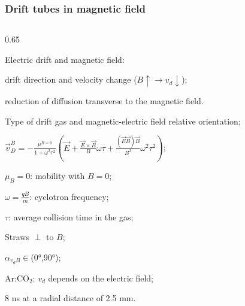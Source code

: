 \documentclass{beamer}
\begin{document}
\begin{frame}
    \frametitle{Drift tubes in magnetic field}

    \vspace{-3mm}
    \begin{columns}
        \begin{column}{0.65\framewidth}
            \setlength{\leftmargini}{1.1em}
            
            \begin{itemize}
            
              {\footnotesize \item Electric drift and magnetic field: }
               \begin{itemize}
                {\footnotesize       
                \item drift direction and velocity change ($ B \uparrow \rightarrow v_d \downarrow $); 
                \item reduction of diffusion transverse to the magnetic field. 
                } 
            \end{itemize}

            
               {\footnotesize
               \vspace{1mm}
		\item Type of drift gas and magnetic-electric field relative orientation;
                \vspace{1mm}
                \item $\vec{v}_D^B=-\frac{\mu^{B=0}}{1+\omega^2 \tau^2}\left(\vec{E}+\frac{\vec{E} \times \vec{B}}{B} \omega \tau+\frac{(\vec{E} \vec{B}) \vec{B}}{B^2} \omega^2 \tau^2\right)$;
               \vspace{1mm}
               \item $\mu_B = 0$: mobility with $B=0$;
               \vspace{1mm}
                \item $\omega = \frac{qB}{m}$: cyclotron frequency; 
                \vspace{1mm}
               \item $\tau$: average collision time in the gas;
                \vspace{1mm}
                \item Straws $\perp$ to $B$;
                \vspace{1mm}
                \item $\alpha_{v_d B} \in $(0°,90°);
                \vspace{1mm}
                \item Ar:CO$_2$: $v_{d}$ depends on the electric field;
               \vspace{1mm}
                \item 8 ns at a radial distance of 2.5 mm.}
              

\end{itemize}
\end{column}
\end{columns}
\end{frame}
\end{document}
